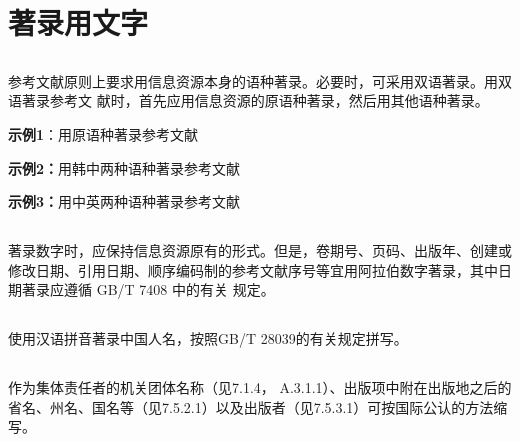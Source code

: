\documentclass{article}
\begin{document}
\section{著录用文字}
\subsection{} 参考文献原则上要求用信息资源本身的语种著录。必要时，可采用双语著录。用双语著录参考文
献时，首先应用信息资源的原语种著录，然后用其他语种著录。

\textbf{示例1}：用原语种著录参考文献

\begin{refsection}
\nocite{周鲁卫2011--}
\nocite{japaneserefc}
\nocite{RUDDOCK2009--}
\nocite{russianrefc}

{\printbibliography[env=indentegenv,heading=none]}
\end{refsection}

\textbf{示例2：}用韩中两种语种著录参考文献
\begin{refsection}
\nocite{李炳穆set}
\nocite{图书馆信息政策set}


{\printbibliography[heading=none,env=indentegenv]}
\end{refsection}

\textbf{示例3：}用中英两种语种著录参考文献
\begin{refsection}
\nocite{熊平set}
\nocite{脱贫攻坚2021set}

{\printbibliography[heading=none,env=indentegenv]}
\end{refsection}


\subsection{} 著录数字时，应保持信息资源原有的形式。但是，卷期号、页码、出版年、创建或修改日期、引用日期、顺序编码制的参考文献序号等宜用阿拉伯数字著录，其中日期著录应遵循 GB/T 7408 中的有关
规定。

\subsection{} 使用汉语拼音著录中国人名，按照GB/T 28039的有关规定拼写。

\subsection{} 作为集体责任者的机关团体名称（见7.1.4， A.3.1.1）、出版项中附在出版地之后的省名、州名、国名等（见7.5.2.1）以及出版者（见7.5.3.1）可按国际公认的方法缩写。
\end{document}
